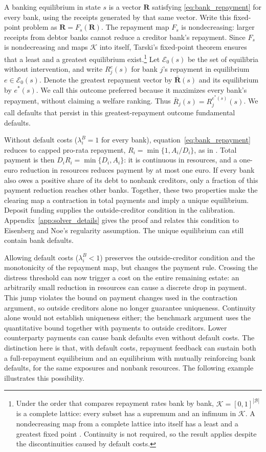 A banking equilibrium in state $s$ is a vector $\mathbf{R}$ satisfying \eqref{eq:bank_repayment} for every bank, using the receipts generated by that same vector. Write this fixed-point problem as $\mathbf{R}=F_s(\mathbf{R})$. The repayment map $F_s$ is nondecreasing: larger receipts from debtor banks cannot reduce a creditor bank's repayment. Since $F_s$ is nondecreasing and maps $\mathcal K$ into itself, Tarski's fixed-point theorem ensures that a least and a greatest equilibrium exist.\footnote{Under the order that compares repayment rates bank by bank, $\mathcal K=[0,1]^{|\mathcal B|}$ is a complete lattice: every subset has a supremum and an infimum in $\mathcal K$. A nondecreasing map from a complete lattice into itself has a least and a greatest fixed point \citep[Theorem~1]{Tarski1955}. Continuity is not required, so the result applies despite the discontinuities caused by default costs.} Let $\mathcal E_0(s)$ be the set of equilibria without intervention, and write $R_j^e(s)$ for bank $j$'s repayment in equilibrium $e\in\mathcal E_0(s)$. Denote the greatest repayment vector by $\bar{\mathbf{R}}(s)$ and its equilibrium by $e^*(s)$. We call this outcome preferred because it maximizes every bank's repayment, without claiming a welfare ranking. Thus $\bar R_j(s)=R_j^{e^*(s)}(s)$. We call defaults that persist in this greatest-repayment outcome fundamental defaults.

Without default costs ($\lambda_i^B=1$ for every bank), equation~\eqref{eq:bank_repayment} reduces to capped pro-rata repayment, $R_i=\min\{1,A_i/D_i\}$, as in \citet{EisenbergNoe2001}. Total payment is then $D_iR_i=\min\{D_i,A_i\}$: it is continuous in resources, and a one-euro reduction in resources reduces payment by at most one euro. If every bank also owes a positive share of its debt to nonbank creditors, only a fraction of this payment reduction reaches other banks. Together, these two properties make the clearing map a contraction in total payments and imply a unique equilibrium. Deposit funding supplies the outside-creditor condition in the calibration. Appendix~\ref{app:solver_details} gives the proof and relates this condition to Eisenberg and Noe's regularity assumption. The unique equilibrium can still contain bank defaults.

Allowing default costs ($\lambda_i^B<1$) preserves the outside-creditor condition and the monotonicity of the repayment map, but changes the payment rule. Crossing the distress threshold can now trigger a cost on the entire remaining estate: an arbitrarily small reduction in resources can cause a discrete drop in payment. This jump violates the bound on payment changes used in the contraction argument, so outside creditors alone no longer guarantee uniqueness. Continuity alone would not establish uniqueness either; the benchmark argument uses the quantitative bound together with payments to outside creditors. Lower counterparty payments can cause bank defaults even without default costs. The distinction here is that, with default costs, repayment feedback can sustain both a full-repayment equilibrium and an equilibrium with mutually reinforcing bank defaults, for the same exposures and nonbank resources. The following example illustrates this possibility.

